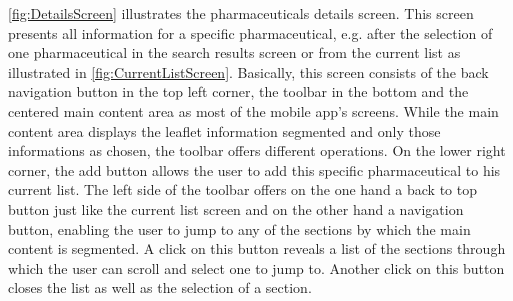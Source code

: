 \ref{fig:DetailsScreen} illustrates the pharmaceuticals details screen. This screen presents all information for a specific pharmaceutical, e.g. after the selection of one pharmaceutical in the search results screen or from the current list as illustrated in \ref{fig:CurrentListScreen}. Basically, this screen consists of the back navigation button in the top left corner, the toolbar in the bottom and the centered main content area as most of the mobile app's screens. While the main content area displays the leaflet information segmented and only those informations as chosen, the toolbar offers different operations. On the lower right corner, the add button allows the user to add this specific pharmaceutical to his current list. The left side of the toolbar offers on the one hand a back to top button just like the current list screen and on the other hand a navigation button, enabling the user to jump to any of the sections by which the main content is segmented. A click on this button reveals a list of the sections through which the user can scroll and select one to jump to. Another click on this button closes the list as well as the selection of a section.

